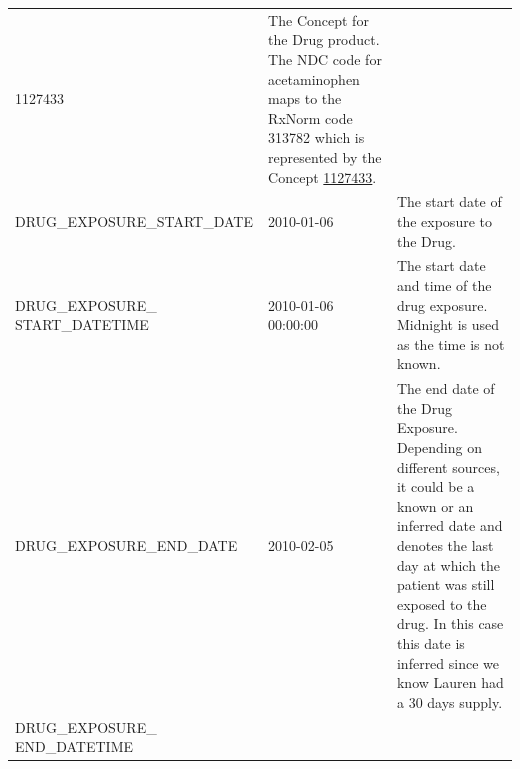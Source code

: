 \documentclass[11pt]{book}
\theoremstyle{definition}
\theoremstyle{definition}
\theoremstyle{definition}
\theoremstyle{remark}
\begin{document}
\begin{longtable}[]{@{}lll@{}}
\begin{minipage}[t]{0.15\columnwidth}
1127433\strut
\end{minipage} & \begin{minipage}[t]{0.49\columnwidth}\raggedright
The Concept for the Drug product. The NDC code for acetaminophen maps to the RxNorm code 313782 which is represented by the Concept \href{http://athena.ohdsi.org/search-terms/terms/1127433}{1127433}.\strut
\end{minipage}\tabularnewline
\begin{minipage}[t]{0.28\columnwidth}\raggedright
DRUG\_EXPOSURE\_START\_DATE\strut
\end{minipage} & \begin{minipage}[t]{0.15\columnwidth}\raggedright
2010-01-06\strut
\end{minipage} & \begin{minipage}[t]{0.49\columnwidth}\raggedright
The start date of the exposure to the Drug.\strut
\end{minipage}\tabularnewline
\begin{minipage}[t]{0.28\columnwidth}\raggedright
DRUG\_EXPOSURE\_ START\_DATETIME\strut
\end{minipage} & \begin{minipage}[t]{0.15\columnwidth}\raggedright
2010-01-06 00:00:00\strut
\end{minipage} & \begin{minipage}[t]{0.49\columnwidth}\raggedright
The start date and time of the drug exposure. Midnight is used as the time is not known.\strut
\end{minipage}\tabularnewline
\begin{minipage}[t]{0.28\columnwidth}\raggedright
DRUG\_EXPOSURE\_END\_DATE\strut
\end{minipage} & \begin{minipage}[t]{0.15\columnwidth}\raggedright
2010-02-05\strut
\end{minipage} & \begin{minipage}[t]{0.49\columnwidth}\raggedright
The end date of the Drug Exposure. Depending on different sources, it could be a known or an inferred date and denotes the last day at which the patient was still exposed to the drug. In this case this date is inferred since we know Lauren had a 30 days supply.\strut
\end{minipage}\tabularnewline
\begin{minipage}[t]{0.28\columnwidth}\raggedright
DRUG\_EXPOSURE\_ END\_DATETIME\strut
\end{minipage} & \begin{minipage}[t]{0.15\columnwidth}\raggedright

\end{minipage}
\end{longtable}
\end{document}
